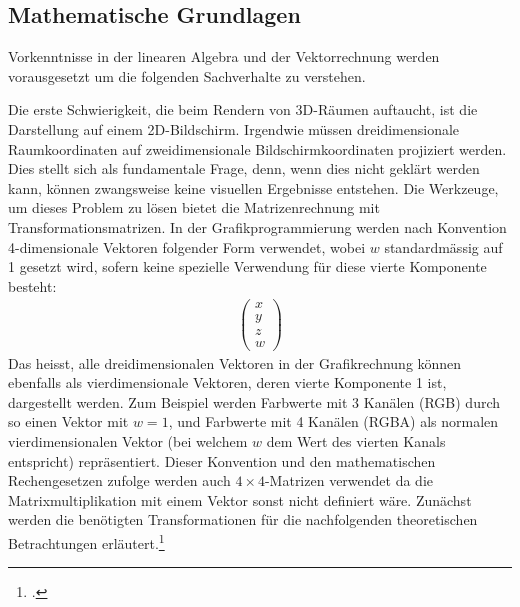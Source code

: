 \documentclass[titlepage, 11pt, a4paper, ngerman]{article}
\begin{document}
\subsection{Mathematische Grundlagen}
Vorkenntnisse in der linearen Algebra und der Vektorrechnung werden vorausgesetzt um die folgenden Sachverhalte zu verstehen.\par
Die erste Schwierigkeit, die beim Rendern von 3D-Räumen auftaucht, ist die Darstellung auf einem 2D-Bildschirm. Irgendwie müssen dreidimensionale Raumkoordinaten auf zweidimensionale Bildschirmkoordinaten projiziert werden. Dies stellt sich als fundamentale Frage, denn, wenn dies nicht geklärt werden kann, können zwangsweise keine visuellen Ergebnisse entstehen. Die Werkzeuge, um dieses Problem zu lösen bietet die Matrizenrechnung mit Transformationsmatrizen. In der Grafikprogrammierung werden nach Konvention 4-dimensionale Vektoren folgender Form verwendet, wobei $w$ standardmässig auf 1 gesetzt wird, sofern keine spezielle Verwendung für diese vierte Komponente besteht:
\begin{align*}
    \begin{pmatrix}
    x \\
    y \\
    z \\
    w
    \end{pmatrix}
\end{align*}
\bigbreak
Das heisst, alle dreidimensionalen Vektoren in der Grafikrechnung können ebenfalls als vierdimensionale Vektoren, deren vierte Komponente 1 ist, dargestellt werden. Zum Beispiel werden Farbwerte mit 3 Kanälen (RGB) durch so einen Vektor mit $w = 1$, und Farbwerte mit 4 Kanälen (RGBA) als normalen vierdimensionalen Vektor (bei welchem $w$ dem Wert des vierten Kanals entspricht) repräsentiert. Dieser Konvention und den mathematischen Rechengesetzen zufolge werden auch $4\times4$-Matrizen verwendet da die Matrixmultiplikation mit einem Vektor sonst nicht definiert wäre. Zunächst werden die benötigten Transformationen für die nachfolgenden theoretischen Betrachtungen erläutert.\footcite{transformations}
\end{document}
